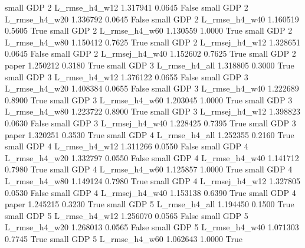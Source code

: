      small      GDP                 2  L_rmse_h4_w12   1.317941      0.0645   False
     small      GDP                 2  L_rmse_h4_w20   1.336792      0.0645   False
     small      GDP                 2  L_rmse_h4_w40   1.160519      0.5605    True
     small      GDP                 2  L_rmse_h4_w60   1.130559      1.0000    True
     small      GDP                 2  L_rmse_h4_w80   1.150412      0.7625    True
     small      GDP                 2 L_rmsej_h4_w12   1.328651      0.0645   False
     small      GDP                 2 L_rmsej_h4_w40   1.152602      0.7625    True
     small      GDP                 2          paper   1.250212      0.3180    True
     small      GDP                 3  L_rmse_h4_all   1.318805      0.3000    True
     small      GDP                 3  L_rmse_h4_w12   1.376122      0.0655   False
     small      GDP                 3  L_rmse_h4_w20   1.408384      0.0655   False
     small      GDP                 3  L_rmse_h4_w40   1.222689      0.8900    True
     small      GDP                 3  L_rmse_h4_w60   1.203045      1.0000    True
     small      GDP                 3  L_rmse_h4_w80   1.223722      0.8900    True
     small      GDP                 3 L_rmsej_h4_w12   1.398823      0.0630   False
     small      GDP                 3 L_rmsej_h4_w40   1.228425      0.7395    True
     small      GDP                 3          paper   1.320251      0.3530    True
     small      GDP                 4  L_rmse_h4_all   1.252355      0.2160    True
     small      GDP                 4  L_rmse_h4_w12   1.311266      0.0550   False
     small      GDP                 4  L_rmse_h4_w20   1.332797      0.0550   False
     small      GDP                 4  L_rmse_h4_w40   1.141712      0.7980    True
     small      GDP                 4  L_rmse_h4_w60   1.125857      1.0000    True
     small      GDP                 4  L_rmse_h4_w80   1.149124      0.7980    True
     small      GDP                 4 L_rmsej_h4_w12   1.327805      0.0530   False
     small      GDP                 4 L_rmsej_h4_w40   1.153138      0.6390    True
     small      GDP                 4          paper   1.245215      0.3230    True
     small      GDP                 5  L_rmse_h4_all   1.194450      0.1500    True
     small      GDP                 5  L_rmse_h4_w12   1.256070      0.0565   False
     small      GDP                 5  L_rmse_h4_w20   1.268013      0.0565   False
     small      GDP                 5  L_rmse_h4_w40   1.071303      0.7745    True
     small      GDP                 5  L_rmse_h4_w60   1.062643      1.0000    True
